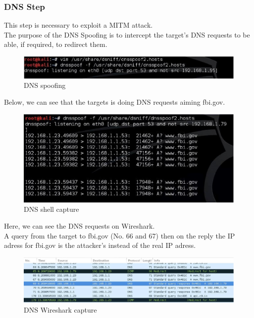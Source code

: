 \documentclass[a4paper, 11pt, oneside]{article}
\begin{document}
\pagebreak
\subsubsection{DNS Step}
This step is necessary to exploit a MITM attack.\\
The purpose of the DNS Spoofing is to intercept the target's DNS requests to be able, if required, to redirect them.\\

\begin{figure}[!h]
	\centering
	\includegraphics[scale=0.5]{../images/dnsSpoof.eps}
	\caption{DNS spoofing}
	\label{DNS_spoofing}
\end{figure}

Below, we can see that the targets is doing DNS requests aiming fbi.gov. \\

\begin{figure}[!h]
	\centering
	\includegraphics[scale=0.6]{../images/DNSCaptureShell.eps}
	\caption{DNS shell capture}
	\label{DNSCaptureShell}
\end{figure}

Here, we can see the DNS requests on Wireshark. \\
A query from the target to fbi.gov (No. 66 and 67) then on the reply the IP adress for fbi.gov is the attacker's instead of the real IP adress. \\

\begin{figure}[!h]
	\centering
	\includegraphics[scale=0.4]{../images/DNSCaptureWireshark.eps}
	\caption{DNS Wireshark capture}
	\label{DNSCaptureWireshark}
\end{figure}
\end{document}
